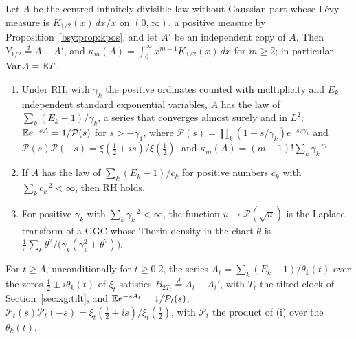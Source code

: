 \begin{proposition}\label{sm:prop:half}
Let $A$ be the centred infinitely divisible law without Gaussian part whose L\'evy measure is $K_{1/2}(x)\,dx/x$ on $(0,\infty)$, a positive measure by Proposition~\ref{bsy:prop:kpos}, and let $A'$ be an independent copy of $A$. Then $Y_{1/2}\overset d=A-A'$, and $\kappa_m(A)=\int_0^\infty x^{m-1}K_{1/2}(x)\,dx$ for $m\ge2$; in particular $\operatorname{Var}A=\mathbb{E} T$.
\begin{enumerate}
\item[(i)] Under RH, with $\gamma_k$ the positive ordinates counted with multiplicity and $E_k$ independent standard exponential variables, $A$ has the law of $\sum_k(E_k-1)/\gamma_k$, a series that converges almost surely and in $L^2$; $\mathbb{E} e^{-sA}=1/\mathcal P(s)$ for $s>-\gamma_1$, where $\mathcal P(s)=\prod_k(1+s/\gamma_k)e^{-s/\gamma_k}$ and $\mathcal P(s)\mathcal P(-s)=\xi(\frac12+is)/\xi(\frac12)$; and $\kappa_m(A)=(m-1)!\sum_k\gamma_k^{-m}$.
\item[(ii)] If $A$ has the law of $\sum_k(E_k-1)/c_k$ for positive numbers $c_k$ with $\sum_kc_k^{-2}<\infty$, then RH holds.
\item[(iii)] For positive $\gamma_k$ with $\sum_k\gamma_k^{-2}<\infty$, the function $u\mapsto \mathcal P(\sqrt u)$ is the Laplace transform of a GGC whose Thorin density in the chart $\theta$ is $\frac1\pi\sum_k\theta^2/\big(\gamma_k(\gamma_k^2+\theta^2)\big)$.
\end{enumerate}
For $t\ge\Lambda$, unconditionally for $t\ge0.2$, the series $A_t=\sum_k(E_k-1)/\theta_k(t)$ over the zeros $\frac12\pm i\theta_k(t)$ of $\xi_t$ satisfies $B_{2T_t}\overset d=A_t-A_t'$, with $T_t$ the tilted clock of Section~\ref{sec:xg:tilt}, and $\mathbb{E} e^{-sA_t}=1/\mathcal P_t(s)$, $\mathcal P_t(s)\mathcal P_t(-s)=\xi_t(\frac12+is)/\xi_t(\frac12)$, with $\mathcal P_t$ the product of (i) over the $\theta_k(t)$.
\end{proposition}

